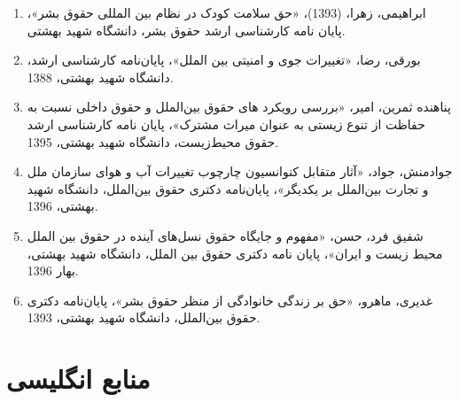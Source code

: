 	\begin{enumerate}
	
	
\item 	ابراهیمی، زهرا، (1393)، «حق سلامت کودک در نظام بین المللی حقوق بشر»، پایان نامه کارشناسی ارشد حقوق بشر، دانشگاه شهید بهشتی.
	
	
\item	بورقی، رضا، «تغییرات جوی و امنیتی بین‌ الملل»، پایان‌نامه کارشناسی ارشد، دانشگاه شهید بهشتی، 1388.

\item پناهنده ثمرین، امیر، «بررسی رویکرد های حقوق بین‌الملل و حقوق داخلی نسبت به حفاظت از تنوع زیستی به عنوان میراث مشترک»، پایان نامه کارشناسی ارشد حقوق  محیط‌زیست، دانشگاه شهید بهشتی، 1395.
	
	\item جواد‌منش، جواد، «آثار متقابل کنوانسیون چارچوب تغییرات آب و هوای سازمان ملل و تجارت بین‌الملل بر یکدیگر»، پایان‌نامه دکتری حقوق بین‌الملل، دانشگاه شهید بهشتی، 1396.
	
\item 	شفیق فرد، حسن، «مفهوم و جایگاه حقوق نسل‌های آینده در حقوق بین الملل محیط زیست و ایران»، پایان نامه دکتری حقوق بین الملل، دانشگاه شهید بهشتی، بهار 1396.

	\item غدیری، ماهرو، «حق بر زندگی خانوادگی از منظر حقوق بشر»، پایان‌نامه دکتری حقوق بین‌الملل، دانشگاه شهید بهشتی، 1393.
	
\end{enumerate}



\newpage

\section*{منابع انگلیسی}

